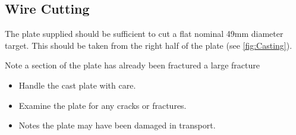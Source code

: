 \subsection{Wire Cutting}
The plate supplied should be sufficient to cut a flat nominal 49mm diameter target. This should be taken from the right half of the plate (see \ref{fig:Casting}).

Note a section of the plate has already been fractured a large fracture 
\begin{itemize}
\item Handle the cast plate with care. 
\item Examine the plate for any cracks or fractures. 
\item Notes the plate may have been damaged in transport. 
\end{itemize}